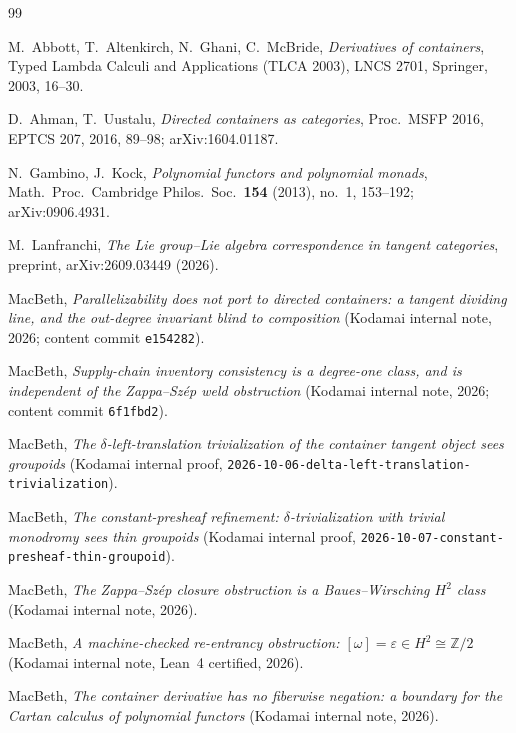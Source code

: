 \documentclass[11pt]{article}
\theoremstyle{definition}
\newcommand{\Z}{\mathbb{Z}}
\begin{document}
\begin{thebibliography}{99}

M.~Abbott, T.~Altenkirch, N.~Ghani, C.~McBride,
\emph{Derivatives of containers},
Typed Lambda Calculi and Applications (TLCA 2003), LNCS 2701, Springer, 2003, 16--30.

D.~Ahman, T.~Uustalu,
\emph{Directed containers as categories},
Proc.\ MSFP 2016, EPTCS 207, 2016, 89--98; arXiv:1604.01187.

N.~Gambino, J.~Kock,
\emph{Polynomial functors and polynomial monads},
Math.\ Proc.\ Cambridge Philos.\ Soc.\ \textbf{154} (2013), no.~1, 153--192; arXiv:0906.4931.

M.~Lanfranchi,
\emph{The Lie group--Lie algebra correspondence in tangent categories},
preprint, arXiv:2609.03449 (2026).

MacBeth,
\emph{Parallelizability does not port to directed containers: a tangent dividing line, and the
out-degree invariant blind to composition}
(Kodamai internal note, 2026; content commit \texttt{e154282}).

MacBeth,
\emph{Supply-chain inventory consistency is a degree-one class, and is independent of the
Zappa--Sz\'ep weld obstruction}
(Kodamai internal note, 2026; content commit \texttt{6f1fbd2}).

MacBeth,
\emph{The $\delta$-left-translation trivialization of the container tangent object sees groupoids}
(Kodamai internal proof, \texttt{2026-10-06-delta-left-translation-trivialization}).

MacBeth,
\emph{The constant-presheaf refinement: $\delta$-trivialization with trivial monodromy sees thin
groupoids}
(Kodamai internal proof, \texttt{2026-10-07-constant-presheaf-thin-groupoid}).

MacBeth,
\emph{The Zappa--Sz\'ep closure obstruction is a Baues--Wirsching $H^2$ class}
(Kodamai internal note, 2026).

MacBeth,
\emph{A machine-checked re-entrancy obstruction: $[\omega]=\varepsilon\in H^2\cong\Z/2$}
(Kodamai internal note, Lean~4 certified, 2026).

MacBeth,
\emph{The container derivative has no fiberwise negation: a boundary for the Cartan calculus of
polynomial functors}
(Kodamai internal note, 2026).

\end{thebibliography}
\end{document}
